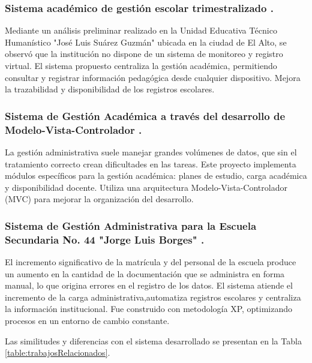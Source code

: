 \subsubsection{Sistema académico de gestión escolar trimestralizado \cite{callisaya2024sistema}.}

Mediante un análisis preliminar realizado en la Unidad Educativa Técnico Humanístico "José Luis Suárez Guzmán" ubicada en la ciudad de El Alto, se observó que la institución no dispone de un sistema de monitoreo y registro virtual. El sistema propuesto centraliza la gestión académica, permitiendo consultar y registrar información pedagógica desde cualquier dispositivo. Mejora la trazabilidad y disponibilidad de los registros escolares.

\subsubsection{Sistema de Gestión Académica a través del desarrollo 
de Modelo-Vista-Controlador \cite{Rojas2019}.}

La gestión administrativa suele manejar grandes volúmenes de datos, que sin el tratamiento correcto crean dificultades en las tareas. Este proyecto implementa módulos específicos para la gestión académica: planes de estudio, carga académica y disponibilidad docente. Utiliza una arquitectura Modelo-Vista-Controlador (MVC) para mejorar la organización del desarrollo.

\subsubsection{Sistema de Gestión Administrativa para la Escuela Secundaria No. 44 "Jorge Luis Borges" \cite{gonzalez2017sistema}.}

El incremento significativo de la matrícula y del personal de la escuela produce un aumento en la cantidad de la documentación que se administra en forma manual, lo que origina errores en el registro de los datos. El sistema atiende el incremento de la carga administrativa,automatiza registros escolares y centraliza la información institucional. Fue construido con metodología XP, optimizando procesos en un entorno de cambio constante.

Las similitudes y diferencias con el sistema desarrollado se presentan en la Tabla \ref{table:trabajosRelacionados}.


